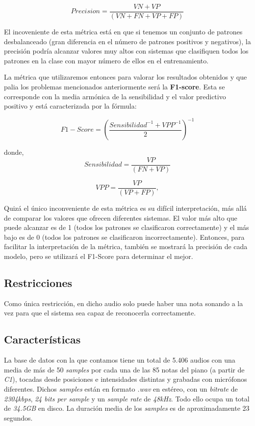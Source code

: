\documentclass[12pt]{article}
\begin{document}
\begin{equation}
	Precision = \frac{VN + VP}{(VN + FN + VP + FP)}
\end{equation}

\smallskip
El incoveniente de esta métrica está en que si tenemos un conjunto de patrones desbalanceado (gran diferencia en el número de
patrones positivos y negativos), la precisión podría alcanzar valores muy altos con sistemas que clasifiquen todos los patrones en la clase con mayor número de ellos
en el entrenamiento.

\bigskip
La métrica que utilizaremos entonces para valorar los resultados obtenidos y que palia los problemas
mencionados anteriormente será la \textbf{F1-score}. Esta se corresponde con la media armónica de la sensibilidad y el
valor predictivo positivo y está caracterizada por la fórmula: 

\begin{equation}
	F1-Score = \left(\frac{Sensibilidad^{-1} + VPP^{-1}}{2}\right)^{-1}
\end{equation}

donde, 
\begin{equation}
	Sensibilidad = \frac{VP}{(FN + VP)}
\end{equation}

\begin{equation}
	VPP = \frac{VP}{(VP + FP)}, 
\end{equation}

\smallskip
Quizá el único inconveniente de esta métrica es su difícil interpretación, más allá de comparar los valores que ofrecen diferentes sistemas.
El valor más alto que puede alcanzar es de 1 (todos los patrones se clasificaron correctamente) y el más bajo es de 0 (todos los patrones se clasificaron
incorrectamente). Entonces, para facilitar la interpretación de la métrica, también se mostrará la precisión de cada modelo, pero se utilizará
el F1-Score para determinar el mejor.

\newpage
\subsection{Restricciones}
\bigskip
Como única restricción, en dicho audio solo puede haber una nota sonando a la vez para que el sistema sea capaz de reconocerla correctamente.

\subsection{Características}
\bigskip
La base de datos con la que contamos tiene un total de 5.406 audios con una media de más de 50 \textit{samples} por cada una de las 85 notas del piano (a partir de \textit{C1}), tocadas
desde posiciones e intensidades distintas y grabadas con micrófonos diferentes. Dichos \textit{samples} están en formato \textit{.wav} en estéreo, con un 
\textit{bitrate} de \textit{2304kbps}, \textit{24 bits per sample} y un \textit{sample rate} de \textit{48kHz}. Todo ello ocupa un total de \textit{34.5GB} en disco.
La duración media de los \textit{samples} es de aproximadamente 23 segundos.
\end{document}
